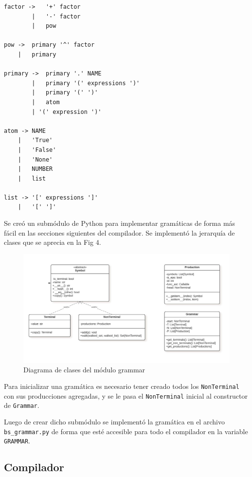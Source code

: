 \begin{verbatim}
factor ->   '+' factor
        |   '-' factor
        |   pow

pow ->  primary '^' factor              
    |   primary

primary ->  primary '.' NAME            
        |   primary '(' expressions ')'        
        |   primary '(' ')'             
        |   atom
        | '(' expression ')'

atom -> NAME                            
    |   'True'                          
    |   'False'                         
    |   'None'                          
    |   NUMBER                          
    |   list

list -> '[' expressions ']'             
    |   '[' ']'                         
\end{verbatim}

Se creó un submódulo de Python para implementar gramáticas de forma más fácil en las secciones siguientes del compilador. Se implementó la jerarquía de clases que se aprecia en la Fig 4.

\begin{figure}
        \centering
        \includegraphics[width=13cm]{./chapters/img/grammar.jpeg}
        \caption{Diagrama de clases del módulo grammar}
\end{figure}

Para inicializar una gramática es necesario tener creado todos los \verb|NonTerminal| con sus producciones agregadas, y se le pasa el \verb|NonTerminal| inicial al constructor de \verb|Grammar|.

Luego de crear dicho submódulo se implementó la gramática en el archivo \verb|bs_grammar.py| de forma que esté accesible para todo el compilador en la variable \verb|GRAMMAR|.

\subsection{Compilador}

